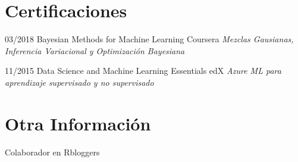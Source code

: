 \documentclass[]{friggeri-cv}
\begin{document}
\section{Certificaciones}
\begin{entrylist}
  \entry
    {03/2018}
    {Bayesian Methods for Machine Learning}
    {Coursera}
    {\emph{Mezclas Gausianas, Inferencia Variacional y Optimización Bayesiana}}
    
  \entry
    {11/2015}
    {Data Science and Machine Learning Essentials}
    {edX}
    {\emph{Azure ML para aprendizaje supervisado y no supervisado}}
\end{entrylist}

\section{Otra Información}
Colaborador en Rbloggers\\
\end{document}
